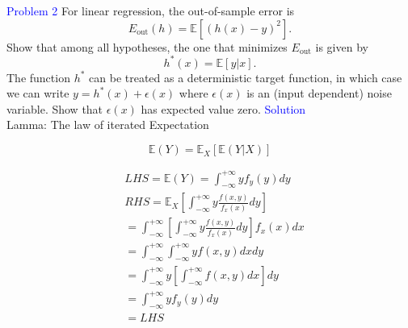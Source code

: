 \textcolor{blue}{Problem 2}
For linear regression, the out-of-sample error is 
\begin{equation}
    E_{\text{out}}(h)=\mathbb{E}[{(h(x)-y)}^2].
\end{equation}
Show that among all hypotheses, the one that minimizes $E_{\text{out}}$ is given by
\begin{equation}
    h^*(x)=\mathbb{E}[y|x].
\end{equation}
The function $h^*$ can be treated as a deterministic target function, in which case we can write $y=h^*(x)+\epsilon(x)$ where $\epsilon(x)$ is an (input dependent) noise variable. Show that $\epsilon(x)$ has expected value zero.
\newline
\textcolor{blue}{Solution}\\
Lamma: The law of iterated Expectation

$$
\mathbb{E}(Y)=\mathbb{E}_X[\mathbb{E}(Y|X)]
$$

$$
\begin{aligned}
& L H S=\mathbb{E}(Y)=\int_{-\infty}^{+\infty} y f_y(y) d y \\
& R H S=\mathbb{E}_X\left[\int_{-\infty}^{+\infty} y \frac{f(x, y)}{f_x(x)} d y\right] \\
&=\int_{-\infty}^{+\infty}\left[\int_{-\infty}^{+\infty} y \frac{f(x, y)}{f_x(x)} d y\right] f_x(x) d x \\
&=\int_{-\infty}^{+\infty} \int_{-\infty}^{+\infty} y f(x, y) d x d y \\
&=\int_{-\infty}^{+\infty} y\left[\int_{-\infty}^{+\infty} f(x, y) d x\right] d y \\
&=\int_{-\infty}^{+\infty} y f_y(y) d y \\
&=L H S
\end{aligned}
$$










\newpage